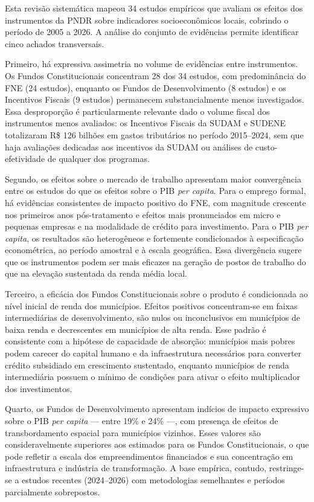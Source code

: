
Esta revisão sistemática mapeou 34 estudos empíricos que avaliam os efeitos dos instrumentos da PNDR sobre indicadores socioeconômicos locais, cobrindo o período de 2005 a 2026. A análise do conjunto de evidências permite identificar cinco achados transversais.

Primeiro, há expressiva assimetria no volume de evidências entre instrumentos. Os Fundos Constitucionais concentram 28 dos 34 estudos, com predominância do FNE (24 estudos), enquanto os Fundos de Desenvolvimento (8 estudos) e os Incentivos Fiscais (9 estudos) permanecem substancialmente menos investigados. Essa desproporção é particularmente relevante dado o volume fiscal dos instrumentos menos avaliados: os Incentivos Fiscais da SUDAM e SUDENE totalizaram R\$ 126 bilhões em gastos tributários no período 2015--2024, sem que haja avaliações dedicadas aos incentivos da SUDAM ou análises de custo-efetividade de qualquer dos programas.

Segundo, os efeitos sobre o mercado de trabalho apresentam maior convergência entre os estudos do que os efeitos sobre o PIB \textit{per capita}. Para o emprego formal, há evidências consistentes de impacto positivo do FNE, com magnitude crescente nos primeiros anos pós-tratamento e efeitos mais pronunciados em micro e pequenas empresas e na modalidade de crédito para investimento. Para o PIB \textit{per capita}, os resultados são heterogêneos e fortemente condicionados à especificação econométrica, ao período amostral e à escala geográfica. Essa divergência sugere que os instrumentos podem ser mais eficazes na geração de postos de trabalho do que na elevação sustentada da renda média local.

Terceiro, a eficácia dos Fundos Constitucionais sobre o produto é condicionada ao nível inicial de renda dos municípios. Efeitos positivos concentram-se em faixas intermediárias de desenvolvimento, são nulos ou inconclusivos em municípios de baixa renda e decrescentes em municípios de alta renda. Esse padrão é consistente com a hipótese de capacidade de absorção: municípios mais pobres podem carecer do capital humano e da infraestrutura necessários para converter crédito subsidiado em crescimento sustentado, enquanto municípios de renda intermediária possuem o mínimo de condições para ativar o efeito multiplicador dos investimentos.

Quarto, os Fundos de Desenvolvimento apresentam indícios de impacto expressivo sobre o PIB \textit{per capita} --- entre 19\% e 24\% ---, com presença de efeitos de transbordamento espacial para municípios vizinhos. Esses valores são consideravelmente superiores aos estimados para os Fundos Constitucionais, o que pode refletir a escala dos empreendimentos financiados e sua concentração em infraestrutura e indústria de transformação. A base empírica, contudo, restringe-se a estudos recentes (2024--2026) com metodologias semelhantes e períodos parcialmente sobrepostos.

